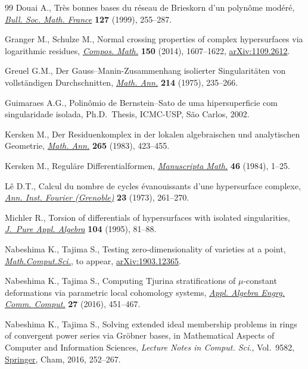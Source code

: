 \begin{thebibliography}{99}
Douai A., Tr\`es bonnes bases du r\'eseau de {B}rieskorn d'un polyn\^ome
 mod\'er\'e, \href{https://doi.org/10.24033/bsmf.2348}{\textit{Bull. Soc. Math. France}} \textbf{127} (1999), 255--287.

Granger M., Schulze M., Normal crossing properties of complex hypersurfaces via
 logarithmic residues, \href{https://doi.org/10.1112/S0010437X13007860}{\textit{Compos. Math.}} \textbf{150} (2014), 1607--1622,
 \href{https://arxiv.org/abs/1109.2612}{arXiv:1109.2612}.

Greuel G.M., Der {G}auss--{M}anin-{Z}usammenhang isolierter {S}ingularit\"aten
 von vollst\"andigen {D}urchschnitten, \href{https://doi.org/10.1007/BF01352108}{\textit{Math. Ann.}} \textbf{214}
 (1975), 235--266.

Guimaraes A.G., Polin\^omio de {B}ernstein--{S}ato de uma hipersuperficie com
 singularidade isolada, Ph.D.~Thesis, {I}CMC-{U}SP, S\~ao Carlos, 2002.

Kersken M., Der {R}esiduenkomplex in der lokalen algebraischen und analytischen
 {G}eometrie, \href{https://doi.org/10.1007/BF01455946}{\textit{Math. Ann.}} \textbf{265} (1983), 423--455.

Kersken M., Regul\"are {D}ifferentialformen, \href{https://doi.org/10.1007/BF01185193}{\textit{Manuscripta Math.}}
 \textbf{46} (1984), 1--25.

L\^e D.T., Calcul du nombre de cycles \'evanouissants d'une hypersurface
 complexe, \href{https://doi.org/10.5802/aif.491}{\textit{Ann. Inst. Fourier (Grenoble)}} \textbf{23} (1973),
 261--270.

Michler R., Torsion of differentials of hypersurfaces with isolated
 singularities, \href{https://doi.org/10.1016/0022-4049(94)00117-2}{\textit{J.~Pure Appl. Algebra}} \textbf{104} (1995), 81--88.

Nabeshima K., Tajima S., Testing zero-dimensionality of varieties at a point,
 \href{https://doi.org/10.1007/s11786-020-00484-y}{\textit{Math.Comput.Sci.}}, {t}o appear, \href{https://arxiv.org/abs/1903.12365}{arXiv:1903.12365}.

Nabeshima K., Tajima S., Computing {T}jurina stratifications of
 {$\mu$}-constant deformations via parametric local cohomology systems,
 \href{https://doi.org/10.1007/s00200-016-0289-4}{\textit{Appl. Algebra Engrg. Comm. Comput.}} \textbf{27} (2016), 451--467.

Nabeshima K., Tajima S., Solving extended ideal membership problems in rings of
 convergent power series via {G}r\"obner bases, in Mathematical Aspects of
 Computer and Information Sciences, \textit{Lecture Notes in Comput. Sci.},
 Vol.~9582, \href{https://doi.org/10.1007/978-3-319-32859-1_22}{Springer}, Cham, 2016, 252--267.


\end{thebibliography}
